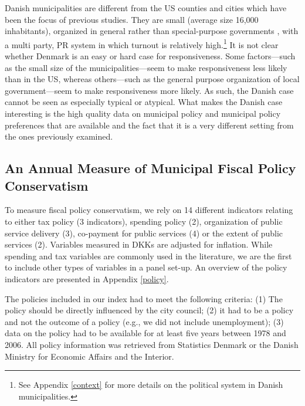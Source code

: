 \documentclass[a4paper,12pt]{article}
\begin{document}
Danish municipalities are different from the US counties and cities which have been the focus of previous studies. They are small (average size 16,000 inhabitants), organized in general rather than special-purpose governments \citep{berry2009imperfect}, with a multi party, PR system in which turnout is relatively high.\footnote{See Appendix \ref{context} for more details on the political system in Danish municipalities.} It is not clear whether Denmark is an easy or hard case for responsiveness.  Some factors---such as the small size of the municipalities---seem to make responsiveness less likely than in the US, whereas others---such as the general purpose organization of local government---seem to make responsiveness more likely. As such, the Danish case cannot be seen as especially typical or atypical. What makes the Danish case interesting is the high quality data on municipal policy and municipal policy preferences that are available and the fact that it is a very different setting from the ones previously examined.


\subsection*{An Annual Measure of Municipal Fiscal Policy Conservatism}

To measure fiscal policy conservatism, we rely on 14 different indicators relating to either tax policy (3 indicators), spending policy (2), organization of public service delivery (3), co-payment for public services (4) or the extent of public services (2). Variables measured in DKKs are adjusted for inflation. While  spending and tax variables are commonly used in the literature, we are the first to include other types of variables in a panel set-up. An overview of the policy indicators are presented in Appendix \ref{policy}.

The policies included in our index had to meet the following criteria: (1) The policy should be directly influenced by the city council; (2) it had to be a policy and not the outcome of a policy (e.g., we did not include unemployment); (3) data on the policy had to be available for at least five years between 1978 and 2006. All policy information was retrieved from Statistics Denmark or the Danish Ministry for Economic Affairs and the Interior.
\end{document}

